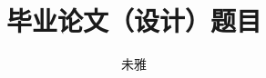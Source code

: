\documentclass[fangfont=STFANGSO.TTF,heifont=simhei.ttf]{zju-proposal}
\title{毕业论文（设计）题目}{浙江大学本科生毕业论文（设计）}
\author{未雅}{3140100000}
\begin{document}
	\makecover
	\begin{refsection}
	
	\thispagestyle{guidepage}
	\end{refsection}
	\tableofcontents
	
	\begin{refsection}	
	
	\end{refsection}
	
	\begin{refsection}
	
	\end{refsection}
	\begin{refsection}
	
	\end{refsection}
	
	
\end{document}
